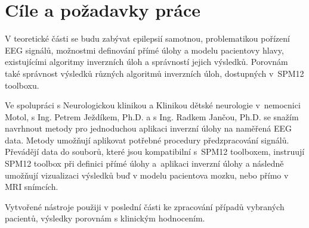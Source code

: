 \section{Cíle a požadavky práce}
V teoretické části se budu zabývat epilepsií samotnou, problematikou pořízení EEG signálů, možnostmi definování přímé úlohy a modelu pacientovy hlavy, existujícími algoritmy inverzních úloh a správností jejich výsledků. Porovnám také správnost výsledků různých algoritmů inverzních úloh, dostupných v~SPM12 toolboxu.

Ve spolupráci s Neurologickou klinikou a Klinikou dětské neurologie v~nemocnici Motol, s Ing. Petrem Ježdíkem, Ph.D. a s Ing. Radkem Jančou, Ph.D. se snažím navrhnout metody pro jednoduchou aplikaci inverzní úlohy na naměřená EEG data. Metody umožňují aplikovat potřebné procedury předzpracování signálů. Převádějí data do souborů, které jsou kompatibilní s~SPM12 toolboxem, instruují SPM12 toolbox při definici přímé úlohy a~aplikaci inverzní úlohy a následně umožňují vizualizaci výsledků buď v modelu pacientova mozku, nebo přímo v MRI snímcích.

Vytvořené nástroje použiji v poslední části ke zpracování případů vybraných pacientů, výsledky porovnám s klinickým hodnocením.
